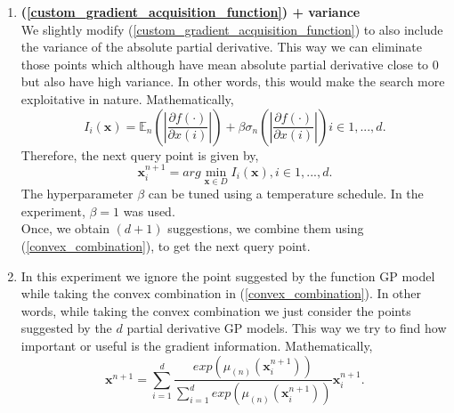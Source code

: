 \documentclass{article}
\begin{document}
\begin{enumerate}
        \item
            \textbf {(\ref{custom_gradient_acquisition_function}) + variance} \\
            We slightly modify (\ref{custom_gradient_acquisition_function}) to also include the variance of the absolute partial derivative. This way we can
            eliminate those points which although have mean absolute partial derivative close to 0 but also have high variance. In other words, this would make
            the search more exploitative in nature. Mathematically,
            \begin{equation}
                I_{i}(\textbf {x}) = \mathbb{E}_{n} \left( \left |\frac{\partial f(\cdot)}{\partial x(i)} \right | \right ) +  \beta\sigma_{n} \left( \left |\frac{\partial f(\cdot)}{\partial x(i)} \right | \right )   i \in {1,...,d}.
                \label{custom_gradient_acquisition_function_plus_variance}
            \end{equation}
            Therefore, the next query point is given by,
            \begin{equation}
                \textbf{x}^{n+1}_{i} = arg \min_{\textbf{x} \in D} I_{i}(\textbf {x}), i \in {1,...,d}.
            \end{equation}
            The hyperparameter $\beta$ can be tuned using a temperature schedule. In the experiment, $\beta=1$ was used. \\
            Once, we obtain $(d+1)$ suggestions, we combine them using (\ref{convex_combination}), to get the next query point.

        \item
            In this experiment we ignore the point suggested by the function GP model while taking the convex combination in (\ref{convex_combination}). In 
            other words, while taking the convex combination we just consider the points suggested by the $d$ partial derivative GP models. This way we try to
            find how important or useful is the gradient information. Mathematically,
            \begin{equation}
                \textbf {x}^{n+1} = \sum_{i=1}^{d} \frac {exp(\mu_{(n)}(\textbf{x}^{n+1}_{i}))}{\sum_{i=1}^{d} exp(\mu_{(n)}(\textbf{x}^{n+1}_{i}))} \textbf{x}^{n+1}_{i}.
                \label{convex_combination_4}
            \end{equation} 


\end{enumerate}
\end{document}
